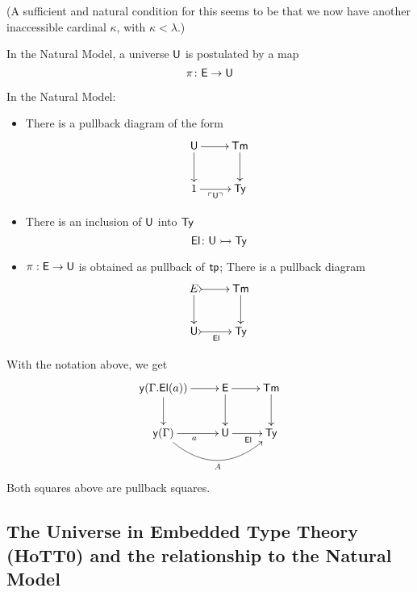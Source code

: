 (A sufficient and natural condition for this seems to be that we now have another inaccessible cardinal $\kappa$, with $\kappa < \lambda$.)

In the Natural Model, a universe $\mathsf{U}$ is postulated by a map
\[
\pi \colon \mathsf{E} \to \mathsf{U}
\]

In the Natural Model:
\begin{itemize}
\item There is a pullback diagram of the form
\[
\xymatrix{
\U \ar[r] \ar[d] & \Term \ar[d] \\
1 \ar[r]_-{\ulcorner \U \urcorner } & \Type }
\]
\item There is an inclusion of $\mathsf{U}$ into $\mathsf{Ty}$
\[
\mathsf{El} \colon \mathsf{U} \rightarrowtail \mathsf{Ty}
\]
\item $\pi : \mathsf{E} \to \mathsf{U}$ is obtained as pullback of $\mathsf{tp}$; There is a pullback diagram
\[
\xymatrix{
E \ar@{>->}[r] \ar[d] & \Term \ar[d] \\
\U \ar@{>->}[r]_-{\El} & \Type }
\]
 \end{itemize}

With the notation above, we get
\[
\xymatrix{
\yo (\Gamma.\El(a)) \ar[r] \ar[d] & \E \ar[r] \ar[d] & \Term \ar[d] \\
\yo (\Gamma) \ar[r]_a  \ar@/_2pc/[rr]_-{A} & \U \ar[r]_{\El} & \Type}
\]
Both squares above are pullback squares.


\subsection{The Universe in Embedded Type Theory (HoTT0) and the relationship to the Natural Model}

